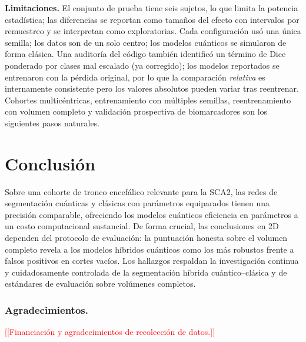 \documentclass[runningheads]{llncs}
\newcommand{\todo}[1]{\textcolor{red}{[[#1]]}}
\begin{document}
\noindent\textbf{Limitaciones.} El conjunto de prueba tiene seis sujetos, lo que
limita la potencia estadística; las diferencias se reportan como tamaños del
efecto con intervalos por remuestreo y se interpretan como exploratorias. Cada
configuración usó una única semilla; los datos son de un solo centro; los
modelos cuánticos se simularon de forma clásica. Una auditoría del código también
identificó un término de Dice ponderado por clases mal escalado (ya corregido);
los modelos reportados se entrenaron con la pérdida original, por lo que la
comparación \emph{relativa} es internamente consistente pero los valores
absolutos pueden variar tras reentrenar. Cohortes multicéntricas, entrenamiento
con múltiples semillas, reentrenamiento con volumen completo y validación
prospectiva de biomarcadores son los siguientes pasos naturales.

\section{Conclusión}
Sobre una cohorte de tronco encefálico relevante para la SCA2, las redes de
segmentación cuánticas y clásicas con parámetros equiparados tienen una
precisión comparable, ofreciendo los modelos cuánticos eficiencia en parámetros
a un costo computacional sustancial. De forma crucial, las conclusiones en 2D
dependen del protocolo de evaluación: la puntuación honesta sobre el volumen
completo revela a los modelos híbridos cuánticos como los más robustos frente a
falsos positivos en cortes vacíos. Los hallazgos respaldan la investigación
continua y cuidadosamente controlada de la segmentación híbrida
cuántico--clásica y de estándares de evaluación sobre volúmenes completos.

\subsubsection*{Agradecimientos.} \todo{Financiación y agradecimientos de
recolección de datos.}
\end{document}
